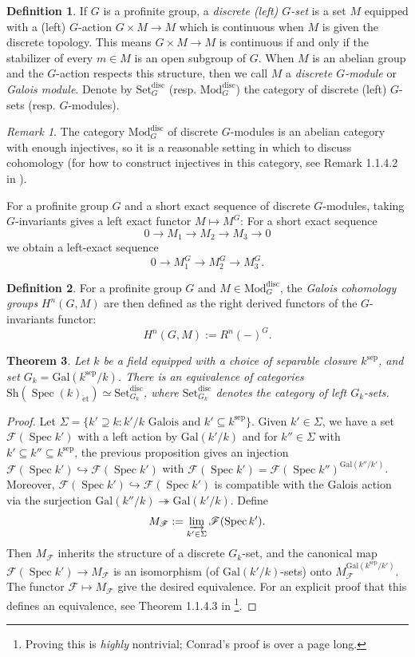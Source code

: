 \documentclass{article}
\def\~#1{\mathscr{#1}}
\numberwithin{equation}{section}
\numberwithin{figure}{section}
\newcommand{\epi}{\twoheadrightarrow}
\newcommand{\mono}{\hookrightarrow}
\newcommand{\Spec}{\mathop{\mathrm{Spec}}}
\newcommand{\et}{\acute{\mathrm{e}}\mathrm{t}}
\newcommand{\sep}{\mathrm{sep}}
\newcommand{\Gal}{\mathrm{Gal}}
\newcommand{\disc}{\mathrm{disc}}
\newcommand{\Set}{\mathrm{Set}}
\newcommand{\Mod}{\mathrm{Mod}}
\newcommand{\Sh}{\mathrm{Sh}}
\theoremstyle{plain}
\newtheorem{thm}{Theorem}[section]
\theoremstyle{definition}
\newtheorem{defn}[thm]{Definition}
\theoremstyle{remark}
\newtheorem*{rmk}{Remark}
\begin{document}
\begin{defn}
If $G$ is a profinite group, a \emph{discrete (left) $G$-set} is a set $M$ equipped with a (left) $G$-action $G \times M \to M$ which is continuous when $M$ is given the discrete topology. This means $G \times M \to M$ is continuous if and only if the stabilizer of every $m \in M$ is an open subgroup of $G$. When $M$ is an abelian group and the $G$-action respects this structure, then we call $M$ a \emph{discrete $G$-module} or \emph{Galois module}. Denote by $\Set_G^\disc$ (resp. $\Mod_G^\disc$) the category of discrete (left) $G$-sets (resp. $G$-modules).
\end{defn}

\begin{rmk}
    The category $\Mod^\disc_{G}$ of discrete $G$-modules is an abelian category with enough injectives, so it is a reasonable setting in which to discuss cohomology (for how to construct injectives in this category, see Remark 1.1.4.2 in \cite{conrad}).
\end{rmk}
For a profinite group $G$ and a short exact sequence of discrete $G$-modules, taking $G$-invariants gives a left exact functor $M \mapsto M^G$: For a short exact sequence 
\[0 \to M_1 \to M_2 \to M_3 \to 0\]
we obtain a left-exact sequence
\[0 \to M_1^G \to M_2^G \to M_3^G.\]
\begin{defn}
For a profinite group $G$ and $M \in \Mod_G^{\disc}$, the \emph{Galois cohomology groups} $H^n(G, M)$ are then defined as the right derived functors of the $G$-invariants functor:
\[H^n(G, M) := R^n(-)^G.\]
\end{defn}
\begin{thm}
    Let $k$ be a field equipped with a choice of separable closure $k^\sep$, and set $G_k = \Gal(k^\sep/k)$. There is an equivalence of categories $\Sh(\Spec(k)_{\et}) \simeq \Set_{G_k}^\disc$, where $\Set_{G_k}^\disc$ denotes the category of left $G_k$-sets.
\end{thm}
\begin{proof}
    Let $\Sigma = \{k' \supseteq k : k'/k \text{ Galois and } k' \subseteq k^\sep\}$. Given $k' \in \Sigma$, we have a set $\~F(\Spec{k'})$ with a left action by $\Gal(k'/k)$ and for $k'' \in \Sigma$ with $k' \subseteq k'' \subseteq k^\sep$, the previous proposition gives an injection $\~F(\Spec{k'}) \mono \~F(\Spec{k'})$ with $\~F(\Spec{k'}) = \~F(\Spec{k''})^{\Gal(k''/k')}$. Moreover, $\~F(\Spec{k'}) \mono \~F(\Spec{k'})$ is compatible with the Galois action via the surjection $\Gal(k''/k) \epi \Gal(k'/k)$. Define
    \[M_{\~F} := \varinjlim_{k' \in \Sigma} \~F(\Spec{k'}).\]
    Then $M_{\~F}$ inherits the structure of a discrete $G_k$-set, and the canonical map $\~F(\Spec{k'}) \to M_{\~F}$ is an isomorphism (of $\Gal(k'/k)$-sets) onto $M_{\~F}^{\Gal(k^\sep/k')}$. The functor $\~F \mapsto M_\~F$ give the desired equivalence. For an explicit proof that this defines an equivalence, see Theorem 1.1.4.3 in \cite{conrad}\footnote{Proving this is \emph{highly} nontrivial; Conrad's proof is over a page long.}.
\end{proof}
\end{document}
